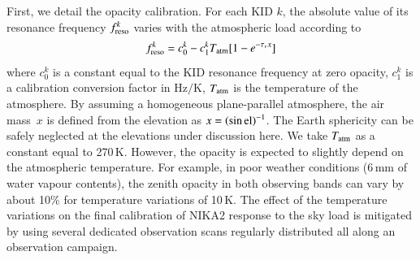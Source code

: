\documentclass[traditionalabstract]{aa}
\newcommand{\elev}{\rm{el}}
\newcommand{\taunu}{\tau_{\nu}}
\newcommand{\airmass}{air mass}
\newcommand{\lp}[1]{#1}
\begin{document}
First, we detail the opacity calibration. For each KID $k$, the
absolute value of its resonance frequency $f_{\rm{reso}}^k$ varies with the
atmospheric load according to
%
\begin{equation}
f_{\rm{reso}}^k  = c_0^k - c_1^k T_{\rm{atm}}[1-e^{-\taunu x}]
\label{eq:skydip}
\end{equation}
%
where $c_0^k$ is a constant equal to the KID resonance frequency at zero
opacity, $c_1^k$ is a calibration conversion factor in Hz$/$K,
$T_{\rm{atm}}$ is the temperature of the atmosphere. %
By assuming a homogeneous plane-parallel atmosphere, the
\airmass\ $x$ is defined from the elevation as
$x = \left(\sin\elev\right)^{-1}$. {\lp The Earth sphericity can be safely
neglected at the elevations under discussion here.}
We take $T_{\rm{atm}}$ as a constant equal to 270\,K. However, the opacity is
expected to slightly depend on the atmospheric temperature. For
example, in poor weather conditions (6\,mm of water vapour contents),
the zenith opacity in {\lp both observing bands} can vary by
about 10\% for temperature variations of 10\,K. The
effect of the temperature variations on the final
calibration of NIKA2 response to the sky load is mitigated by using
several dedicated observation scans regularly distributed all along an
observation campaign.
\end{document}
